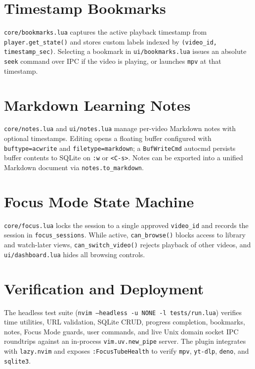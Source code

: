 \documentclass[11pt,a4paper]{article}
\begin{document}
\section{Timestamp Bookmarks}
\texttt{core/bookmarks.lua} captures the active playback timestamp from \texttt{player.get\_state()} and stores custom labels indexed by \texttt{(video\_id, timestamp\_sec)}. Selecting a bookmark in \texttt{ui/bookmarks.lua} issues an absolute \texttt{seek} command over IPC if the video is playing, or launches \texttt{mpv} at that timestamp.

\section{Markdown Learning Notes}
\texttt{core/notes.lua} and \texttt{ui/notes.lua} manage per-video Markdown notes with optional timestamps. Editing opens a floating buffer configured with \texttt{buftype=acwrite} and \texttt{filetype=markdown}; a \texttt{BufWriteCmd} autocmd persists buffer contents to SQLite on \texttt{:w} or \texttt{<C-s>}. Notes can be exported into a unified Markdown document via \texttt{notes.to\_markdown}.

\section{Focus Mode State Machine}
\texttt{core/focus.lua} locks the session to a single approved \texttt{video\_id} and records the session in \texttt{focus\_sessions}. While active, \texttt{can\_browse()} blocks access to library and watch-later views, \texttt{can\_switch\_video()} rejects playback of other videos, and \texttt{ui/dashboard.lua} hides all browsing controls.

\section{Verification and Deployment}
The headless test suite (\texttt{nvim --headless -u NONE -l tests/run.lua}) verifies time utilities, URL validation, SQLite CRUD, progress completion, bookmarks, notes, Focus Mode guards, user commands, and live Unix domain socket IPC roundtrips against an in-process \texttt{vim.uv.new\_pipe} server. The plugin integrates with \texttt{lazy.nvim} and exposes \texttt{:FocusTubeHealth} to verify \texttt{mpv}, \texttt{yt-dlp}, \texttt{deno}, and \texttt{sqlite3}.
\end{document}
